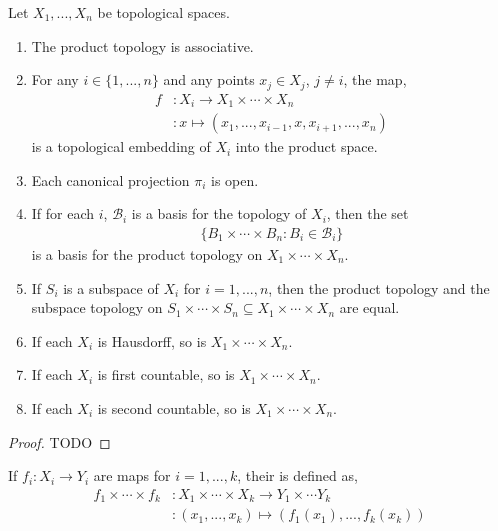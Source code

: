 \begin{proposition}
	Let $ X_{1},...,X_{n} $ be topological spaces.
	\begin{enumerate}
		\item The product topology is associative.
		\item For any $ i \in \{ 1,...,n \} $ and any points $ x_{j}\in X_{j} $, $ j \neq i $, the map,
		      \begin{align*}
			      f & :X_{i} \to X_{1}\times \cdots \times X_{n}             \\
			        & :x \mapsto ( x_{1},...,x_{i-1}, x, x_{i+1},...,x_{n} )
		      \end{align*}
		      is a topological embedding of $ X_{i} $ into the product space.
		\item Each canonical projection $ \pi_{i} $ is open.
		\item If for each $ i $, $ \mathcal{B}_{i} $ is a basis for the topology of $ X_{i} $, then the set
		      \begin{align*}
			      \{ B_{1}\times \cdots \times B_{n}: B_{i}\in \mathcal{B}_{i} \}
		      \end{align*}
		      is a basis for the product topology on $ X_{1}\times \cdots \times X_{n} $.
		\item If $ S_{i} $ is a subspace of $ X_{i} $ for $ i=1,...,n $, then the product topology and the subspace topology on $ S_{1}\times \cdots \times S_{n} \subseteq X_{1}\times \cdots \times X_{n} $ are equal.
		\item If each $ X_{i} $ is Hausdorff, so is $ X_{1}\times \cdots \times X_{n} $.
		\item If each $ X_{i} $ is first countable, so is $ X_{1}\times \cdots \times X_{n} $.
		\item If each $ X_{i} $ is second countable, so is $ X_{1}\times \cdots \times X_{n} $.
	\end{enumerate}
	\begin{proof}
		TODO
	\end{proof}
\end{proposition}

\begin{definition}
	If $ f_{i}:X_{i}\to Y_{i} $ are maps for $ i=1,...,k $, their  is defined as,
	\begin{align*}
		f_{1}\times \cdots \times f_{k} & : X_{1}\times \cdots \times X_{k}\to Y_{1}\times \cdots Y_{k}         \\
		                                & : ( x_{1},..., x_{k} ) \mapsto ( f_{1}( x_{1} ),..., f_{k}( x_{k} ) )
	\end{align*}
\end{definition}

